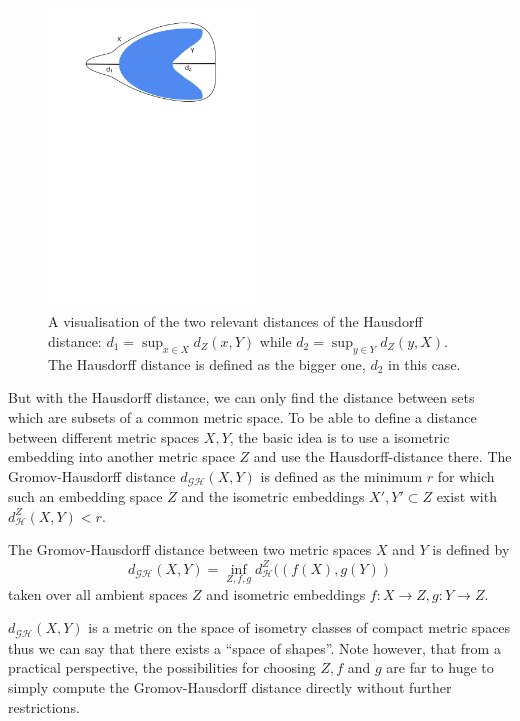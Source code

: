 \begin{figure}[h]
	\centering
	\includegraphics[width = 0.5\textwidth]{pictures/hausdorff}
	\caption{A visualisation of the two relevant distances of the Hausdorff distance: $d_1 = \sup_{x \in X} d_Z(x,Y)$ while $d_2 = \sup_{y \in Y} d_Z(y,X)$. The Hausdorff distance is defined as the bigger one, $d_2$ in this case.}
	\label{fig:hausdorff}
\end{figure}

But with the Hausdorff distance, we can only find the distance between sets which are subsets of a common metric space.
To be able to define a distance between different metric spaces $X,Y$, the basic idea is to use a isometric embedding into another metric space $Z$ and use the Hausdorff-distance there.
The Gromov-Hausdorff distance $d_\mathcal{GH}(X,Y)$ is defined as the minimum $r$ for which such an embedding space $Z$ and the isometric embeddings $X',Y'\subset Z$ exist with $d^Z_\mathcal{H}(X,Y) < r$.
\begin{mydef}
	The Gromov-Hausdorff distance between two metric spaces $X$ and $Y$ is defined by
	$$d_\mathcal{GH}(X,Y) = \inf_{Z,f,g} d^Z_\mathcal{H}((f(X), g(Y))$$
	taken over all ambient spaces $Z$ and isometric embeddings $f:X \rightarrow Z, g: Y \rightarrow Z$.
\end{mydef}
$d_\mathcal{GH}(X,Y)$ is a metric on the space of isometry classes of compact metric spaces thus we can say that there exists a ``space of shapes''.
Note however, that from a practical perspective, the possibilities for choosing $Z,f$ and $g$ are far to huge to simply compute the Gromov-Hausdorff distance directly without further restrictions.

